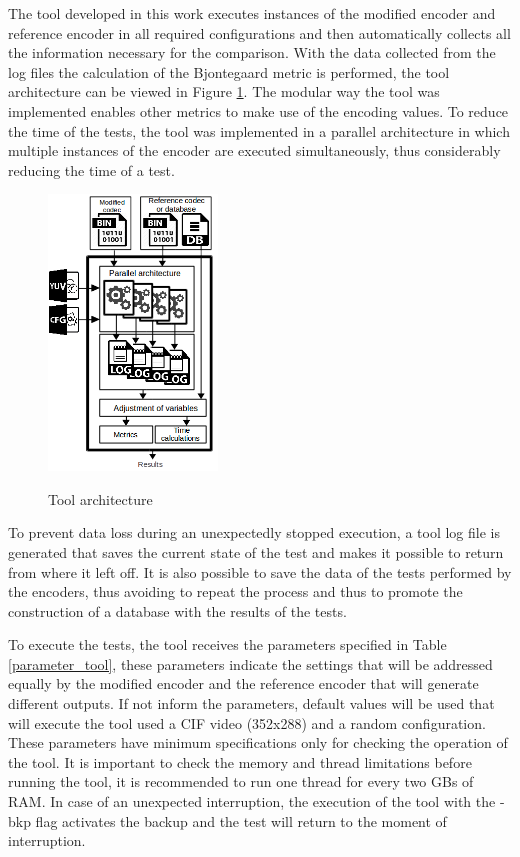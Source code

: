 \documentclass{acm_proc_article-sp}
\begin{document}
The tool developed in this work executes instances of the modified encoder and reference encoder in all required configurations and then automatically collects all the information necessary for the comparison. With the data collected from the log files the calculation of 
the Bjontegaard \cite{Bjontegaard} metric is performed, the tool architecture can be viewed in Figure \ref{fig:fluxo}. The modular way the tool was implemented enables other metrics to make use of the encoding values. To reduce the time of the tests, the tool was implemented in a parallel architecture in which multiple instances of the encoder are executed simultaneously, thus considerably reducing the time of a test.

\FloatBarrier
\begin{figure}[!ht]
	\centering
	\caption{Tool architecture}
	\includegraphics[width=0.4\textwidth]{figures/fluxo.png}
	\label{fig:fluxo}	
\end{figure}
\FloatBarrier

To prevent data loss during an unexpectedly stopped execution, a tool log file is generated that saves the current state of the test and makes it possible to return from where it left off. It is also possible to save the data of the tests performed by the encoders, thus avoiding to repeat the process and thus to promote the construction of a database with the results of the tests.

To execute the tests, the tool receives the parameters specified in Table \ref{parameter_tool}, these parameters indicate the settings that will be addressed equally by the modified encoder and the reference encoder that will generate different outputs. If not inform the parameters, default values will be used that will execute the tool used a CIF video (352x288) and a random configuration. 
These parameters have minimum specifications only for checking the operation of the tool. It is important to check the memory and thread limitations before running the tool, it is recommended to run one thread for every two GBs of RAM. In case of an unexpected interruption, the execution of the tool with the -bkp flag activates the backup and the test will return to the moment of interruption.
\end{document}
